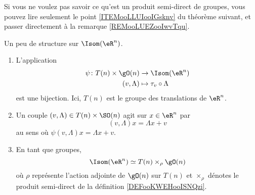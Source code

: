 Si vous ne voulez pas savoir ce qu'est un produit semi-direct de groupes, vous pouvez lire seulement le point \ref{ITEMooLLUIooIGsknv} du théorème suivant, et passer directement à la remarque \ref{REMooLUEZooIwvTqu}.
\begin{theorem}     \label{THOooQJSRooMrqQct}
    Un peu de structure sur \( \Isom(\eR^n)\).
    \begin{enumerate}
        \item       \label{ITEMooLLUIooIGsknv}
            L'application
            \begin{equation}
                \begin{aligned}
                    \psi\colon T(n)\times \gO(n)&\to \Isom(\eR^n) \\
                    (v,\Lambda)&\mapsto \tau_v\circ\Lambda 
                \end{aligned}
            \end{equation}
            est une bijection. Ici,  \( T(n)\) est le groupe des translations de \( \eR^n\).
        \item
            Un couple \( (v,\Lambda)\in T(n)\times\SO(n)\) agit sur \( x\in \eR^n\) par
            \begin{equation}
                (v,\Lambda)x=\Lambda x+v
            \end{equation}
            au sens où \( \psi(v,\Lambda)x=\Lambda x+v\).
        \item       \label{ITEMooEWSIooNKzRxB}
            En tant que groupes,
            \begin{equation}
                \Isom(\eR^n)\simeq T(n)\times_{\rho}\gO(n)
            \end{equation}
            où \( \rho\) représente l'action adjointe de \( \gO(n)\) sur \( T(n)\) et \( \times_{\rho}\) dénotes le produit semi-direct de la définition \ref{DEFooKWEHooISNQzi}.
    \end{enumerate}
\end{theorem}

